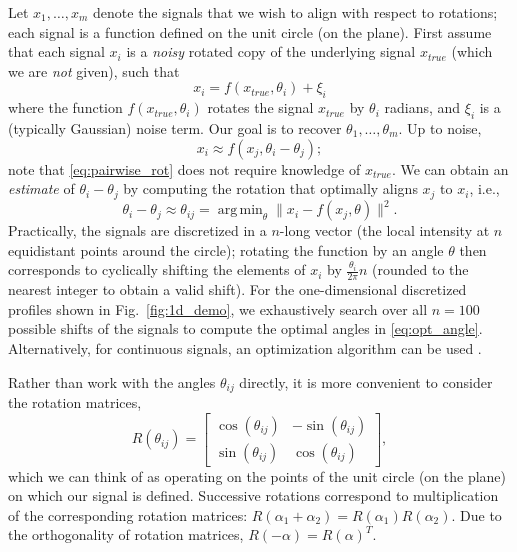 \documentclass{pnastwo}
\DeclareMathOperator*{\argmin}{arg\,min}
\newcommand{\fig}[0]{Fig.}
\begin{document}
\begin{article}
Let $ x_1, \dots, x_m$ denote the signals that we wish to align with respect to rotations;
each signal is a function defined on the unit circle (on the plane).
%
%
First assume that each signal $x_i$ is a {\it noisy} rotated copy of the underlying signal $x_{true}$
(which we are {\it not} given), such that
\begin{equation}
x_i = f(x_{true}, \theta_i) + \xi_i
\end{equation}
where the function $f(x_{true}, \theta_i)$ rotates the signal $x_{true}$ by $\theta_i$ radians, and $\xi_i$ is a (typically Gaussian) noise term.
%
Our goal is to recover $\theta_1, \dots, \theta_m$.
%
Up to noise,
\begin{equation} \label{eq:pairwise_rot}
x_i \approx f(x_j, \theta_i - \theta_j) ;
\end{equation}
note that \eqref{eq:pairwise_rot} does not require knowledge of $x_{true}$.
%
We can obtain an {\it estimate} of $\theta_i - \theta_j$ by computing the rotation that optimally aligns $x_j$ to $x_i$,
i.e., %
%
\begin{equation} \label{eq:opt_angle}
\theta_i - \theta_j \approx \theta_{ij} = \argmin_{\theta} \|x_i - f(x_j, \theta)\|^2.
\end{equation}
%
Practically, the signals are discretized in a $n$-long vector (the local intensity at $n$ equidistant points around the circle);
rotating the function by an angle $\theta$ then corresponds to cyclically shifting the elements of $x_i$
by $\frac{\theta_i}{2 \pi} n$ (rounded to the nearest integer to obtain a valid shift).
%
For the one-dimensional discretized profiles shown in \fig~\ref{fig:1d_demo}, we exhaustively search over all $n=100$ possible shifts of the signals to compute the optimal angles in \eqref{eq:opt_angle}.
%
Alternatively, for continuous signals, an optimization algorithm
can be used \cite{ahuja2007template}.

Rather than work with the angles $\theta_{ij}$ directly, it is more convenient to consider the	 rotation matrices,
\begin{equation} \label{eq:R_theta}
R(\theta_{ij}) = \begin{bmatrix}
\cos(\theta_{ij}) & -\sin(\theta_{ij}) \\
\sin(\theta_{ij}) & \cos(\theta_{ij})
\end{bmatrix},
\end{equation}
which we can think of as operating on the points of the unit circle (on the plane) on which our signal is defined.
%
Successive rotations correspond to multiplication of the corresponding rotation matrices: $R(\alpha_1 + \alpha_2) = R(\alpha_1) R(\alpha_2)$.
%
Due to the orthogonality of rotation matrices, $R(-\alpha) = R(\alpha)^T$.


\end{article}
\end{document}
